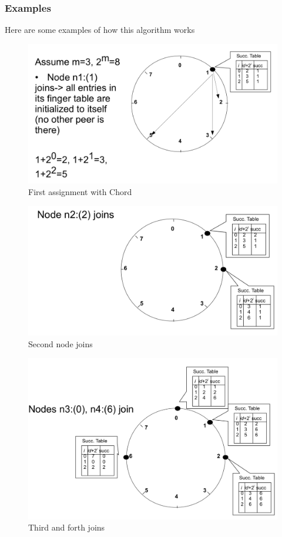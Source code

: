 \documentclass[paper=a4, fontsize=11pt]{scrartcl} %
\numberwithin{equation}{section} %
\numberwithin{figure}{section} %
\numberwithin{table}{section} %
\begin{document}
\subsubsection*{Examples}
Here are some examples of how this algorithm works
 \begin{figure}[H]
  \centering
  \includegraphics[width=1\textwidth]{img/chord1.png}
  \caption{First assignment with Chord}
  
\end{figure} \begin{figure}[H]
  \centering
  \includegraphics[width=1\textwidth]{img/chord2.png}
  \caption{Second node joins}
  
\end{figure} \begin{figure}[H]
  \centering
  \includegraphics[width=1\textwidth]{img/chord3.png}
  \caption{Third and forth joins}
  
\end{figure}
\end{document}
